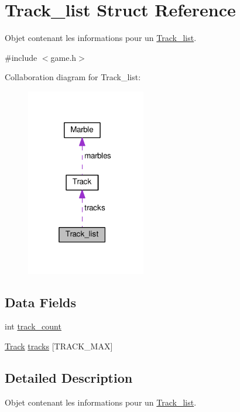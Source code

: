 \hypertarget{struct_track__list}{}\section{Track\+\_\+list Struct Reference}
\label{struct_track__list}


Objet contenant les informations pour un \hyperlink{struct_track__list}{Track\+\_\+list}.  




{\ttfamily \#include $<$game.\+h$>$}



Collaboration diagram for Track\+\_\+list\+:
\nopagebreak
\begin{figure}[H]
\begin{center}
\leavevmode
\includegraphics[width=148pt]{struct_track__list__coll__graph}
\end{center}
\end{figure}
\subsection*{Data Fields}
\begin{DoxyCompactItemize}
\item 
int \hyperlink{struct_track__list_ac955ea3b75270e8be80c62e8e6f4abc2}{track\+\_\+count}
\item 
\hyperlink{struct_track}{Track} \hyperlink{struct_track__list_a7c409b6c0307ab068387e40e51f139f9}{tracks} \mbox{[}T\+R\+A\+C\+K\+\_\+\+M\+AX\mbox{]}
\end{DoxyCompactItemize}


\subsection{Detailed Description}
Objet contenant les informations pour un \hyperlink{struct_track__list}{Track\+\_\+list}. 

